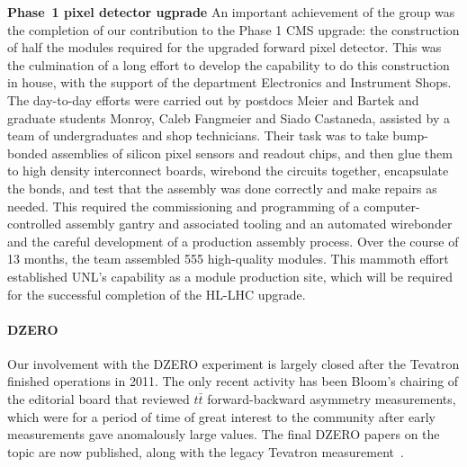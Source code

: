 {\bf Phase~1 pixel detector ugprade}
An important achievement of the group was the completion of our contribution to the Phase 1 CMS upgrade: the construction of half the modules required for the upgraded forward pixel detector.  This was the culmination of a long effort to develop the capability to do this construction in house, with the support of the department Electronics and Instrument Shops.  The day-to-day efforts were carried out by postdocs Meier and Bartek and graduate students Monroy, Caleb Fangmeier and Siado Castaneda, assisted by a team of undergraduates and shop technicians.  Their task was to take bump-bonded assemblies of silicon pixel sensors and readout chips, and then glue them to high density interconnect boards, wirebond the circuits together, encapsulate the bonds, and test that the assembly was done correctly and make repairs as needed.  This required the commissioning and programming of a computer-controlled assembly gantry and associated tooling and an automated wirebonder and the careful development of a production assembly process.  Over the course of 13 months, the team assembled 555 high-quality modules.
This mammoth effort established UNL's capability as a module production site, which will be required for the successful completion of the HL-LHC upgrade.

%

\paragraph{DZERO}
Our involvement with the DZERO experiment is largely closed
after the Tevatron finished operations in 2011.  The only recent activity has been Bloom's chairing of the editorial board that reviewed $t\bar{t}$ forward-backward asymmetry measurements, which were 
for a period of time 
of great interest to the community after early measurements gave anomalously large values.  The final DZERO papers on the topic are now published, along with the legacy Tevatron measurement~\cite{bib:D0afb}.


